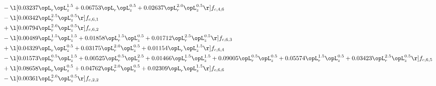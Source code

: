 \begin{alignat}{2}
& - \l[  0.03237 \opL_r \opL_z^{1.5} +  0.06753 \opL_r \opL_z^{0.5} +  0.02637 \opL_r^{2.0} \opL_z^{0.5}  \r] f_{c,4,6} \nonumber \\ 
& - \l[  0.00342 \opL_r^{2.5} \opL_z^{0.5}  \r] f_{c,6,1} \nonumber \\ 
& + \l[  0.00794 \opL_r^{2.0} \opL_z^{0.5}  \r] f_{c,6,2} \nonumber \\ 
& - \l[  0.00489 \opL_r^{1.5} \opL_z^{1.5} +  0.01858 \opL_r^{1.5} \opL_z^{0.5} +  0.01712 \opL_r^{2.5} \opL_z^{0.5}  \r] f_{c,6,3} \nonumber \\ 
& + \l[  0.04329 \opL_r \opL_z^{0.5} +  0.03175 \opL_r^{2.0} \opL_z^{0.5} +  0.01154 \opL_r \opL_z^{1.5}  \r] f_{c,6,4} \nonumber \\ 
& - \l[  0.01573 \opL_r^{0.5} \opL_z^{1.5} +  0.00525 \opL_r^{0.5} \opL_z^{2.5} +  0.01466 \opL_r^{1.5} \opL_z^{1.5} +  0.09005 \opL_r^{0.5} \opL_z^{0.5} +  0.05574 \opL_r^{1.5} \opL_z^{0.5} +  0.03423 \opL_r^{2.5} \opL_z^{0.5}  \r] f_{c,6,5} \nonumber \\ 
& + \l[  0.08658 \opL_r \opL_z^{0.5} +  0.04762 \opL_r^{2.0} \opL_z^{0.5} +  0.02309 \opL_r \opL_z^{1.5}  \r] f_{c,6,6} \nonumber \\ 
& - \l[  0.00361 \opL_r^{2.0} \opL_z^{0.5}  \r] f_{c,2,2} \nonumber \\ 
\end{alignat} 


